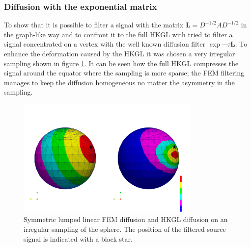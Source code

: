\subsubsection{Diffusion with the exponential matrix}

To show that it is possible to filter a signal with the matrix $\mathbf L = D^{-1/2}AD^{-1/2}$ in the graph-like way and to confront it to the full HKGL with tried to filter a signal concentrated on a vertex  with the well known diffusion filter $\exp{-\tau \mathbf L}$. To enhance the deformation caused by the HKGL it was chosen a very irregular sampling shown in figure \ref{fig:FEM lumped symmetric diffusion on irregular sampling}. It can be seen how the full HKGL compresses the signal around the equator where the sampling is more sparse; the FEM filtering manages to keep the diffusion homogeneous no matter the asymmetry in the sampling. 
\begin{figure}[h]
	\label{fig:FEM lumped symmetric diffusion on irregular sampling}
	\centering
	\includegraphics[width=0.8\textwidth]{figs/Chapter3/diffusion.png}
	\caption{Symmetric lumped linear FEM diffusion and HKGL diffusion on an irregular sampling of the sphere. The position of the filtered source signal is indicated with a black star.}
\end{figure}






